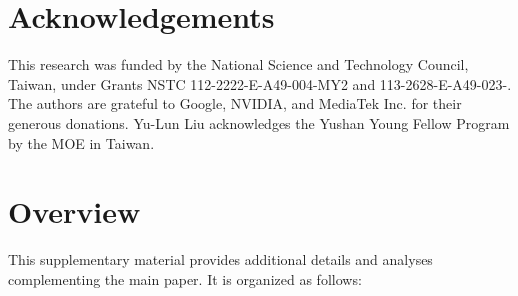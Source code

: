\documentclass[runningheads]{llncs}
\begin{document}




\section*{Acknowledgements}
This research was funded by the National Science and Technology Council, Taiwan, under Grants NSTC 112-2222-E-A49-004-MY2 and 113-2628-E-A49-023-. The authors are grateful to Google, NVIDIA, and MediaTek Inc. for their generous donations. Yu-Lun Liu acknowledges the Yushan Young Fellow Program by the MOE in Taiwan.

%
%




\clearpage

\appendix

\section{Overview}

This supplementary material provides additional details and analyses complementing the main paper. It is organized as follows:
\end{document}
